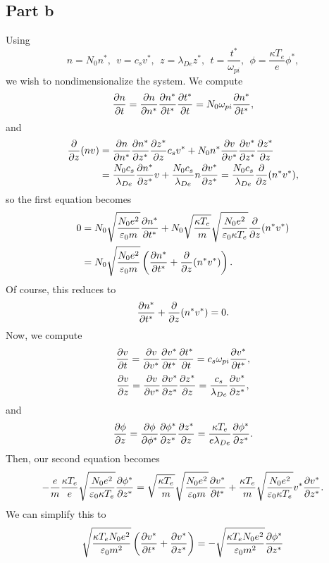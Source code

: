 \documentclass{article}
\begin{document}
\subsection{Part b}
Using 
\[
n=N_0 n^*, ~~v=c_s v^*, ~~z=\lambda_{De} z^*, ~~t=\frac{t^*}{\omega_{pi}}, ~~\phi=\frac{\kappa T_e}{e} \phi^*,
\]
we wish to nondimensionalize the system. We compute
\[
\frac{\partial n}{\partial t}=\frac{\partial n}{\partial n^*}\frac{\partial n^*}{\partial t^*}\frac{\partial t^*}{\partial t}=N_0\omega_{pi}\frac{\partial n^*}{\partial t^*},
\]
and
\begin{align*}
\frac{\partial }{\partial z}(nv)&=\frac{\partial n}{\partial n^*}\frac{\partial n^*}{\partial z^*}\frac{\partial z^*}{\partial z}c_sv^*+N_0n^*\frac{\partial v}{\partial v^*}\frac{\partial v^*}{\partial z^*}\frac{\partial z^*}{\partial z}\\&=\frac{N_0c_s}{\lambda_{De}}\frac{\partial n^*}{\partial z^*}v+\frac{N_0c_s}{\lambda_{De}}n\frac{\partial v^*}{\partial z^*}=\frac{N_0c_s}{\lambda_{De}}\frac{\partial }{\partial z}(n^*v^*),
\end{align*}
so the first equation becomes
\begin{align*}
0&=N_0\sqrt{\frac{N_0 e^2}{\varepsilon_0 m}}\frac{\partial n^*}{\partial t^*}+N_0\sqrt{\frac{\kappa T_e}{m}}\sqrt{\frac{N_0 e^2}{\varepsilon_0 \kappa T_e}}\frac{\partial }{\partial z}(n^*v^*)\\&=
N_0\sqrt{\frac{N_0 e^2}{\varepsilon_0 m}}\left(\frac{\partial n^*}{\partial t^*}+\frac{\partial }{\partial z}(n^*v^*)\right).
\end{align*}
Of course, this reduces to
\[
\frac{\partial n^*}{\partial t^*}+\frac{\partial }{\partial z}(n^*v^*)=0.
\]
Now, we compute 
\begin{align*}
\frac{\partial v}{\partial t}=\frac{\partial v}{\partial v^*}\frac{\partial v^*}{\partial t^*}\frac{\partial t^*}{\partial t}=c_s\omega_{pi}\frac{\partial v^*}{\partial t^*},
\end{align*}
\begin{align*}
\frac{\partial v}{\partial z}=\frac{\partial v}{\partial v^*}\frac{\partial v^*}{\partial z^*}\frac{\partial z^*}{\partial z}=\frac{c_s}{\lambda_{De}}\frac{\partial v^*}{\partial z^*},
\end{align*}
and
\begin{align*}
\frac{\partial \phi}{\partial z}=\frac{\partial \phi}{\partial \phi^*}\frac{\partial \phi^*}{\partial z^*}\frac{\partial z^*}{\partial z}=\frac{\kappa T_e}{e\lambda_{De}}\frac{\partial \phi^*}{\partial z^*}.
\end{align*}
Then, our second equation becomes
\begin{align*}
-\frac{e}{m}\frac{\kappa T_e}{e}\sqrt{\frac{N_0 e^2}{\varepsilon_0 \kappa T_e}}\frac{\partial \phi^*}{\partial z^*}=\sqrt{\frac{\kappa T_e}{m}}\sqrt{\frac{N_0 e^2}{\varepsilon_0 m}}\frac{\partial v^*}{\partial t^*}+\frac{\kappa T_e}{m}\sqrt{\frac{N_0 e^2}{\varepsilon_0 \kappa T_e}}v^*\frac{\partial v^*}{\partial z^*}.
\end{align*}
We can simplify this to
\begin{align*}
\sqrt{\frac{\kappa T_e N_0 e^2}{\varepsilon_0 m^2}}\left(\frac{\partial v^*}{\partial t^*}+\frac{\partial v^*}{\partial z^*}\right)=-\sqrt{\frac{\kappa T_e N_0 e^2}{\varepsilon_0 m^2}}\frac{\partial \phi^*}{\partial z^*}
\end{align*}
\end{document}
